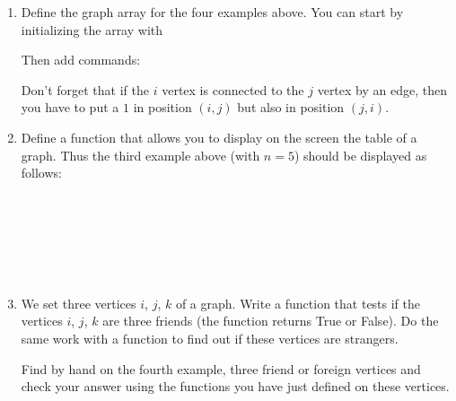 \documentclass[11pt,class=report,crop=false]{standalone}
\begin{document}
\begin{activite}
\begin{enumerate}
  \item Define the graph array for the four examples above.
  You can start by initializing the array with   
  
  Then add commands: 
  
  Don't forget that if the $i$ vertex is connected to the $j$ vertex by an edge, then you have to put a $1$ in position $(i,j)$ but also in position $(j,i)$. 
  
  \item Define a function  that allows you to display on the screen the table of a graph.
  Thus the third example above (with $n=5$) should be displayed as follows:
\begin{center}
\\
\\
\\
\\
\\
\end{center}

  \item We set three vertices $i$, $j$, $k$ of a graph. Write a function  that tests if the vertices $i$, $j$, $k$ are three friends (the function returns \og{}True\fg{} or \og{}False\fg{}). Do the same work with a  function to find out if these vertices are strangers.
  
Find by hand on the fourth example, three friend or foreign vertices and check your answer using the functions you have just defined on these vertices.

\end{enumerate}   
     
\end{activite}


\end{document}
